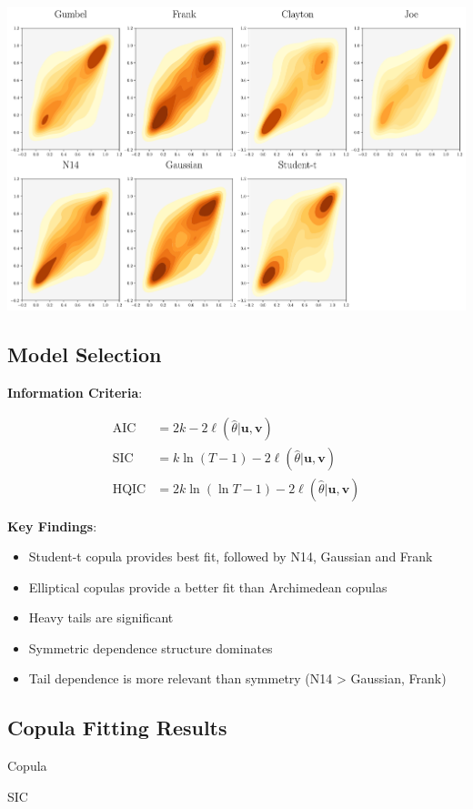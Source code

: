 \documentclass[
  letterpaper,
  DIV=11,
  numbers=noendperiod]{scrartcl}
\providecommand{\tightlist}{%
  \setlength{\itemsep}{0pt}\setlength{\parskip}{0pt}}\usepackage{longtable,booktabs,array}
\begin{document}
\begin{center}
\includegraphics[width=0.5\linewidth,height=\textheight,keepaspectratio]{simple_Presentation_files/mediabag/images/converted/copula_samples_comparison.pdf}
\end{center}

\subsection{Model Selection}\label{model-selection}

\textbf{Information Criteria}:

\[
\begin{array}{ll}
\text{AIC} &= 2k - 2\ell(\hat{\theta}|\mathbf{u,v})
\\
\text{SIC} &= k\ln(T-1) - 2\ell(\hat{\theta}|\mathbf{u,v})
\\
\text{HQIC} &= 2k\ln(\ln T-1) - 2\ell(\hat{\theta}|\mathbf{u,v})
\end{array}
\]

\textbf{Key Findings}:

\begin{itemize}
\tightlist
\item
  Student-t copula provides best fit, followed by N14, Gaussian and
  Frank
\item
  Elliptical copulas provide a better fit than Archimedean copulas
\item
  Heavy tails are significant
\item
  Symmetric dependence structure dominates
\item
  Tail dependence is more relevant than symmetry (N14 \textgreater{}
  Gaussian, Frank)
\end{itemize}

\subsection{Copula Fitting Results}\label{copula-fitting-results}

Copula

SIC
\end{document}
